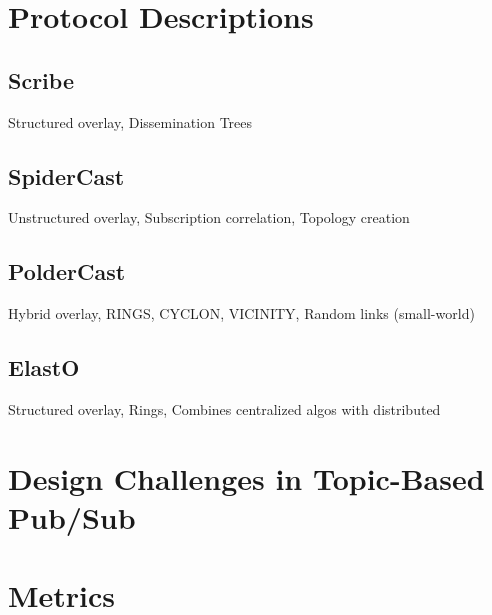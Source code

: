 \documentclass[UKenglish, a4paper]{ifimaster}
\begin{document}
\chapter{Protocol Descriptions}
\label{ch:protocol-descriptions}
\section{Scribe}
Structured overlay, Dissemination Trees
\section{SpiderCast}
Unstructured overlay, Subscription correlation, Topology creation
\section{PolderCast}
Hybrid overlay, RINGS, CYCLON, VICINITY, Random links (small-world)
\section{ElastO}
Structured overlay, Rings, Combines centralized algos with distributed

\chapter{Design Challenges in Topic-Based Pub/Sub}
\label{ch:desired-system-properties-and-trade-offs}


\chapter{Metrics}
\label{ch:metrics}

\end{document}
